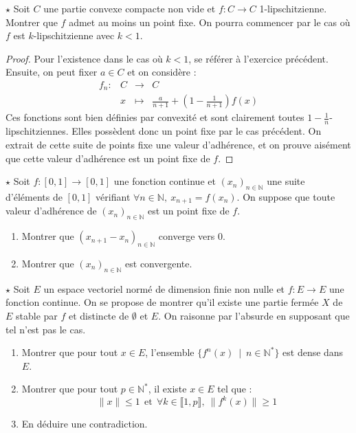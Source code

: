 \documentclass[french,a4paper]{article}
\newcommand{\N}{\mathbb{N}}
\newcommand{\st}{^*}
\theoremstyle{plain}
\theoremstyle{definition}
\theoremstyle{remark}
\begin{document}
\begin{ex}{$\star$}
	Soit $C$ une partie convexe compacte non vide et $f:C\to C$ 1-lipschitzienne. Montrer que $f$ admet au moins un point fixe. On pourra commencer par le cas où $f$ est $k$-lipschitzienne avec $k<1$.
\end{ex}
\begin{proof}
	Pour l'existence dans le cas où $k<1$, se référer à l'exercice précédent. Ensuite, on peut fixer $a\in C$ et on considère : $$\begin{array}{lrcl}
		f_n:&C&\longrightarrow&C\\
		&x&\longmapsto &\displaystyle\frac{a}{n+1}+\left(1-\frac{1}{n+1}\right)f(x)
	\end{array}$$ Ces fonctions sont bien définies par convexité et sont clairement toutes $\displaystyle 1-\frac{1}{n}$-lipschitziennes. Elles possèdent donc un point fixe par le cas précédent. On extrait de cette suite de points fixe une valeur d'adhérence, et on prouve aisément que cette valeur d'adhérence est un point fixe de $f$.
\end{proof}

\begin{ex}{$\star$}
	Soit $f:[0,1]\to[0,1]$ une fonction continue et $(x_n)_{n\in\N}$ une suite d'éléments de $[0,1]$ vérifiant $\forall n\in\N,\ x_{n+1}=f(x_n)$. On suppose que toute valeur d'adhérence de $(x_n)_{n\in\N}$ est un point fixe de $f$.
	\begin{enumerate}
		\item Montrer que $(x_{n+1}-x_n)_{n\in\N}$ converge vers $0$.
		\item Montrer que $(x_n)_{n\in\N}$ est convergente.
	\end{enumerate}
\end{ex}

\begin{ex}{$\star$}
	Soit $E$ un espace vectoriel normé de dimension finie non nulle et $f:E\to E$ une fonction continue. On se propose de montrer qu'il existe une partie fermée $X$ de $E$ stable par $f$ et distincte de $\emptyset$ et $E$. On raisonne par l'absurde en supposant que tel n'est pas le cas.
	\begin{enumerate}
		\item Montrer que pour tout $x\in E$, l'ensemble $\{f^n(x)\ \mid \ n\in\N\st\}$ est dense dans $E$.
		\item Montrer que pour tout $p\in\N\st$, il existe $x\in E$ tel que : $$\lVert x\rVert\leqslant 1\ \ \text{et}\ \ \forall k\in\llbracket1,p\rrbracket,\ \lVert f^k(x)\rVert\geqslant 1$$
		\item En déduire une contradiction.
	\end{enumerate}
\end{ex}
\end{document}
